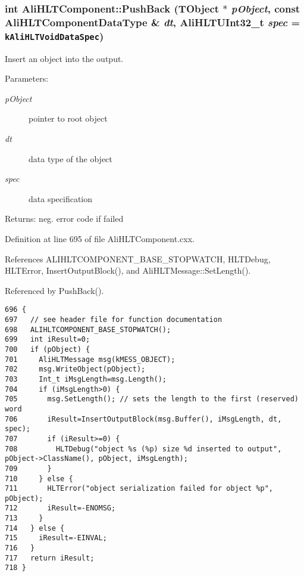 \subsubsection{\setlength{\rightskip}{0pt plus 5cm}int Ali\-HLTComponent::Push\-Back (TObject $\ast$ {\em p\-Object}, const {\bf Ali\-HLTComponent\-Data\-Type} \& {\em dt}, {\bf Ali\-HLTUInt32\_\-t} {\em spec} = {\tt {\bf k\-Ali\-HLTVoid\-Data\-Spec}})\hspace{0.3cm}{\tt  [protected]}}\label{classAliHLTComponent_b23}


Insert an object into the output. \begin{Desc}
\item[Parameters:]
\begin{description}
\item[{\em p\-Object}]pointer to root object \item[{\em dt}]data type of the object \item[{\em spec}]data specification \end{description}
\end{Desc}
\begin{Desc}
\item[Returns:]neg. error code if failed \end{Desc}


Definition at line 695 of file Ali\-HLTComponent.cxx.

References ALIHLTCOMPONENT\_\-BASE\_\-STOPWATCH, HLTDebug, HLTError, Insert\-Output\-Block(), and Ali\-HLTMessage::Set\-Length().

Referenced by Push\-Back().

\footnotesize\begin{verbatim}696 {
697   // see header file for function documentation
698   ALIHLTCOMPONENT_BASE_STOPWATCH();
699   int iResult=0;
700   if (pObject) {
701     AliHLTMessage msg(kMESS_OBJECT);
702     msg.WriteObject(pObject);
703     Int_t iMsgLength=msg.Length();
704     if (iMsgLength>0) {
705       msg.SetLength(); // sets the length to the first (reserved) word
706       iResult=InsertOutputBlock(msg.Buffer(), iMsgLength, dt, spec);
707       if (iResult>=0) {
708         HLTDebug("object %s (%p) size %d inserted to output", pObject->ClassName(), pObject, iMsgLength);
709       }
710     } else {
711       HLTError("object serialization failed for object %p", pObject);
712       iResult=-ENOMSG;
713     }
714   } else {
715     iResult=-EINVAL;
716   }
717   return iResult;
718 }
\end{verbatim}\normalsize 


